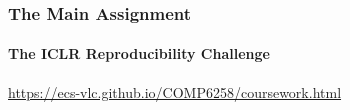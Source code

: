 \documentclass[\beamerclass]{beamer}
\begin{document}
	
	

\begin{frame}
	\frametitle{The Main Assignment}
	\framesubtitle{The ICLR Reproducibility Challenge}
	\url{https://ecs-vlc.github.io/COMP6258/coursework.html}
\end{frame}
\end{document}
